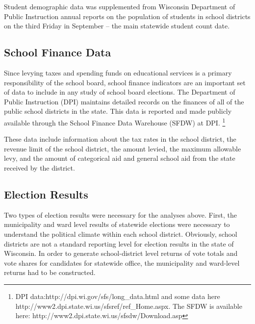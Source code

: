 Student demographic data was supplemented from Wisconsin Department of Public 
Instruction annual reports on the population of students in school districts on 
the third Friday in September -- the main statewide student count date. 

\subsection*{School Finance Data}

Since levying taxes and spending funds on educational services is a primary 
responsibility of the school board, school finance indicators are an important 
set of data to include in any study of school board elections. The Department of 
Public Instruction (DPI) maintains detailed records on the finances 
of all of the public school districts in the state. This data is reported and 
made publicly available through the School Finance Data Warehouse (SFDW) at DPI.
\footnote{DPI data:http://dpi.wi.gov/sfs/long\_data.html and some data here 
http://www2.dpi.state.wi.us/sfsref/ref\_Home.aspx. The SFDW is available here: 
http://www2.dpi.state.wi.us/sfsdw/Download.asp} 

These data include information about the tax rates in the school district, the 
revenue limit of the school district, the amount levied, the maximum allowable 
levy, and the amount of categorical aid and general school aid from the state 
received by the district. 

\subsection*{Election Results}

Two types of election results were necessary for the analyses above. First, 
the municipality and ward level results of statewide elections were necessary to
understand the political climate within each school district. Obviously, school 
districts are not a standard reporting level for election results in the state of 
Wisconsin. In order to generate school-district level returns of vote totals and 
vote shares for candidates for statewide office, the municipality and ward-level 
returns had to be constructed. 

